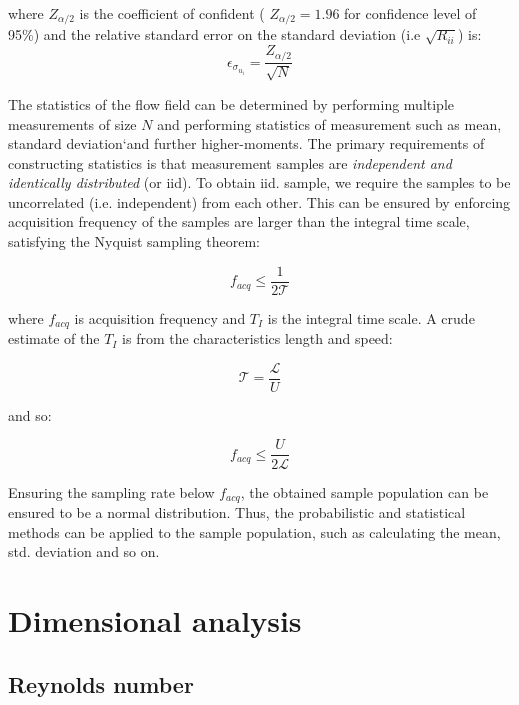 where $Z_{\alpha/2}$ is the coefficient of confident ( $Z_{\alpha/2}=1.96$ for confidence level of 95\%) and the relative standard error on the standard deviation (i.e $\sqrt{R_{ii}}$) is:
\begin{equation}
\epsilon_{\sigma_{u_i}} = \frac{Z_{\alpha/2}}{\sqrt{N}}
\end{equation}

The statistics of the flow field can be determined by performing multiple measurements of size $N$ and performing statistics of measurement such as mean, standard deviation`and further higher-moments. The primary requirements of constructing statistics is that measurement samples are \textit{independent and identically distributed} (or iid). To obtain iid. sample, we require the samples to be uncorrelated (i.e. independent) from each other. This can be ensured by enforcing acquisition frequency of the samples are larger than the integral time scale, satisfying the Nyquist sampling theorem:

\begin{equation}
f_{acq} \le \frac{1}{2 \mathcal{T}}
\end{equation}

where $f_{acq}$ is acquisition frequency and $T_I$ is the integral time scale. A crude estimate of the $T_I$ is from the characteristics length and speed:

\begin{equation}
\mathcal{T} = \frac{\mathcal{L}}{U}
\end{equation}

and so:

\begin{equation}
f_{acq} \le \frac{U}{2 \mathcal{L}}
\end{equation}

Ensuring the sampling rate below $f_{acq}$, the obtained sample population can be ensured to be a normal distribution. Thus, the probabilistic and statistical methods can be applied to the sample population, such as calculating the mean, std. deviation and so on.



\section{Dimensional analysis}

\subsection*{Reynolds number}

